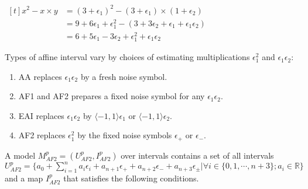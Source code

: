 \begin{center}
$\begin{aligned}[t]
    x^2 - x \times y  &= (3 + \epsilon_1)^2 - (3 + \epsilon_1) \times (1 + \epsilon_2)\\
     &= 9 + 6\epsilon_1 + \epsilon_1^2- (3 + 3\epsilon_2 + \epsilon_1 + \epsilon_1\epsilon_2) \\
     &= 6 + 5\epsilon_1 - 3\epsilon_2 + \epsilon_1^2 + \epsilon_1\epsilon_2
\end{aligned}$
\end{center}
Types of affine interval vary by choices of estimating multiplications $\epsilon_1^2$ and $\epsilon_1\epsilon_2$:
\begin{enumerate}
\item AA \cite{Comba93affinearithmetic, Stolfi97self-validatednumerical} replaces $\epsilon_1\epsilon_2$ by a fresh noise symbol. 
\item AF1 and AF2 \cite{Messine_extensionsof} prepares a fixed noise symbol for any $\epsilon_1\epsilon_2$.
\item EAI \cite{Ngoc:2009:ORE:1685167.1685421} replaces $\epsilon_1\epsilon_2$ by $\langle -1, 1 \rangle\epsilon_1$ or $\langle -1, 1 \rangle\epsilon_2$.
\item AF2 \cite{Messine_extensionsof} replaces $\epsilon_1^2$ by the fixed noise symbols $\epsilon_+$ or $\epsilon_-$.
\end{enumerate}
A model $M^p_{AF2} = (U^p_{AF2}, I^p_{AF2})$ over intervals contains a set of all intervals $U^p_{AF2} = \{a_0 + \sum\limits_{i=1}^{n}a_i\epsilon_i + a_{n+1}\epsilon_+ + a_{n+2}\epsilon_- + a_{n+3}\epsilon_{\pm} | \forall i \in \{0, 1, \cdots, n+3\}; a_i \in \mathbb{R}\}$ and a map $I^p_{AF2}$ that satisfies the following conditions.
